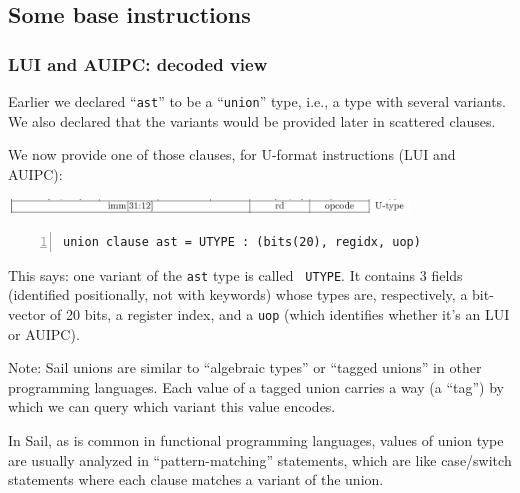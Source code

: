 \documentclass[aspectratio=169]{beamer}
\newcommand{\slidefont}{\scriptsize}
\newcommand{\cf}{\scriptsize\tt}
\begin{document}

\subsection{Some base instructions}


\begin{frame}[fragile]
  \frametitle{LUI and AUIPC: decoded view}

  \slidefont

  Earlier we declared ``{\cf ast}'' to be a ``{\cf union}'' type,
  i.e., a type with several variants.  We also declared that the
  variants would be provided later in scattered clauses.

  \vspace{1ex}
    
  We now provide one of those clauses, for U-format instructions (LUI and AUIPC):

  \begin{center}
    \includegraphics[width=0.8\textwidth]{Figures/Fig_RISCV_U_format.png}
  \end{center}

  \vspace{1ex}
    
  \begin{Verbatim}[frame=single, numbers=left, label = File riscv\_insts\_base.sail]
union clause ast = UTYPE : (bits(20), regidx, uop)
  \end{Verbatim}

  \begin{minipage}{\textwidth}
    This says: one variant of the {\cf ast} type is called {\cf
      UTYPE}.  It contains 3 fields (identified positionally, not with
    keywords) whose types are, respectively, a bit-vector of 20 bits,
    a register index, and a {\cf uop} (which identifies whether it's
    an LUI or AUIPC).

    \vspace{1ex}

    Note: Sail unions are similar to ``algebraic types'' or ``tagged
    unions'' in other programming languages.  Each value of a tagged
    union carries a way (a ``tag'') by which we can query which
    variant this value encodes.

    \vspace{1ex}

    In Sail, as is common in functional programming languages, values
    of union type are usually analyzed in ``pattern-matching''
    statements, which are like case/switch statements where each
    clause matches a variant of the union.
  \end{minipage}

\end{frame}
\end{document}
